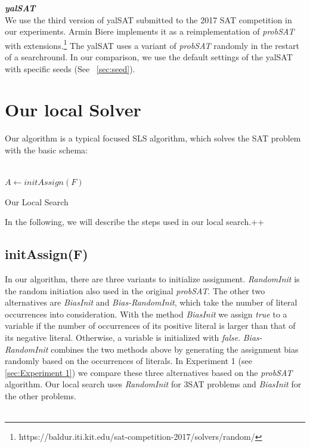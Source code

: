 \documentclass[12pt,a4paper,twoside]{scrartcl}
\numberwithin{equation}{section}
\begin{document}
\emph{\textbf{yalSAT}}\\
We use the third version of yalSAT submitted to the 2017 SAT competition in our experiments. Armin Biere implements it as a reimplementation of \emph{probSAT}  with extensions.\footnote{https://baldur.iti.kit.edu/sat-competition-2017/solvers/random/}  The yalSAT uses a variant of \emph{probSAT} randomly in the restart of a searchround. In our comparison, we use the default settings of the yalSAT with specific seeds (See ~\ref{sec:seed}).
\clearpage
\section{Our local Solver}
\label{sec:local}
 Our algorithm is a typical focused SLS algorithm, which solves the SAT problem with the basic schema:\\
\\
\begin{algorithm}[H]
  $A \leftarrow initAssign(F)$ \;
 \caption{Our Local Search}
\end{algorithm}
 In the following, we will describe the steps used in our local search.++\\
\subsection{initAssign(F)}
In our algorithm, there are three variants to initialize assignment.
\emph{RandomInit} is the random initiation also used in the original \emph{probSAT}. The other two alternatives are \emph{BiasInit} and \emph{Bias-RandomInit}, which take the number of literal occurrences into consideration. With the method \emph{BiasInit} we assign \emph{true} to a variable if the number of occurrences of its positive literal is larger than that of its negative literal. Otherwise, a variable is initialized with \emph{false}. \emph{Bias-RandomInit} combines the two methods above by generating the assignment bias randomly based on the occurrences of literals.  In Experiment 1 (see \ref{sec:Experiment 1}) we compare these three alternatives based on the \emph{probSAT} algorithm. Our local search uses \emph{RandomInit} for 3SAT problems and \emph{BiasInit} for the other problems.\\
\\
\end{document}
